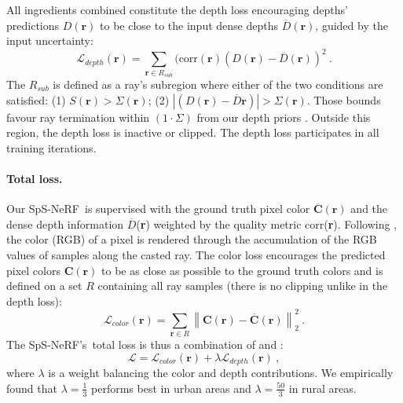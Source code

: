 \documentclass{isprs} %
\newcommand{\OurNeRFShort}{{SpS-NeRF}}
\begin{document}
All ingredients combined constitute the depth loss encouraging depths' predictions $D(\textbf{r})$ to be close to the input dense depths $ \overline{D}(\textbf{r})$, guided by the input uncertainty:
\begin{equation}
    \mathcal{L}_{depth}(\textbf{r}) = \sum_{\textbf{r} \in R_{sub}} (\text{corr}(\textbf{r})(D(\textbf{r}) - \overline{D}(\textbf{r}))^2~.
    \label{depthloss}
\end{equation}
%
The $R_{sub}$ is defined as a ray's subregion where either of the two conditions are satisfied: (1) $S(\mathbf{r}) > \Sigma(\mathbf{r})$; (2) $\left|(D(\textbf{r}) - \overline{D}\textbf{r})\right| > \Sigma(\mathbf{r})$. Those bounds favour ray termination within  $\left(1\cdot\Sigma\right)$ from our depth priors \cite{roessle2022dense}. Outside this region, the depth loss is inactive or clipped. The depth loss participates in all training iterations.
%
\paragraph{Total loss.}
Our \OurNeRFShort~is supervised with the ground truth pixel color $\textbf{$\overline{\mathbf{C}}$}(\textbf{r})$  and the dense depth information $\overline{D}$(\textbf{r}) weighted by the quality metric corr(\textbf{r}). Following , the color (RGB) of a pixel is rendered through the accumulation of the RGB values of samples along the casted ray. The color loss encourages the predicted pixel colors $\textbf{C}(\textbf{r})$ to be as close as possible to the ground truth colors and is defined on a set $R$ containing all ray samples (there is no clipping unlike in the depth loss):
\begin{equation}
    \mathcal{L}_{color}(\textbf{r}) = \sum_{\textbf{r} \in R} \left \| \textbf{C}(\textbf{r}) - \textbf{$\overline{\mathbf{C}}$}(\textbf{r}) \right \| _2 ^2~.
    \label{colorloss}
\end{equation}
%
The \OurNeRFShort's~total loss is thus a combination of  and :
\begin{equation}
    \mathcal{L} = \mathcal{L}_{color}(\textbf{r}) + \lambda \mathcal{L}_{depth}(\textbf{r})~,
    \label{loss}
\end{equation}
where $\lambda$ is a weight balancing the color and depth contributions. We empirically found that $\lambda = \frac{1}{3}$ performs best in urban areas and $\lambda = \frac{50}{3}$ in rural areas.
 
\end{document}
